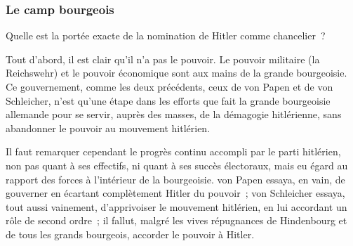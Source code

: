\documentclass[french,twoside]{book} %
\begin{document}
\subsubsection[{Le camp bourgeois}]{Le camp bourgeois}
\noindent Quelle est la portée exacte de la nomination de Hitler comme chancelier ?\par
Tout d'abord, il est clair qu'il n'a pas le pouvoir. Le pouvoir militaire (la Reichswehr) et le pouvoir économique sont aux mains de la grande bour­geoisie. Ce gouvernement, comme les deux précédents, ceux de von Papen et de von Schleicher, n'est qu'une étape dans les efforts que fait la grande bourgeoisie allemande pour se servir, auprès des masses, de la démagogie hitlérienne, sans abandonner le pouvoir au mouvement hitlérien.\par
Il faut remarquer cependant le progrès continu accompli par le parti hitlérien, non pas quant à ses effectifs, ni quant à ses succès électoraux, mais eu égard au rapport des forces à l'intérieur de la bourgeoisie. von Papen essaya, en vain, de gouverner en écartant complètement Hitler du pouvoir ; von Schleicher essaya, tout aussi vainement, d'apprivoiser le mouvement hitlérien, en lui accordant un rôle de second ordre ; il fallut, malgré les vives répugnances de Hindenbourg et de tous les grands bourgeois, accorder le pouvoir à Hitler.\par
\end{document}
